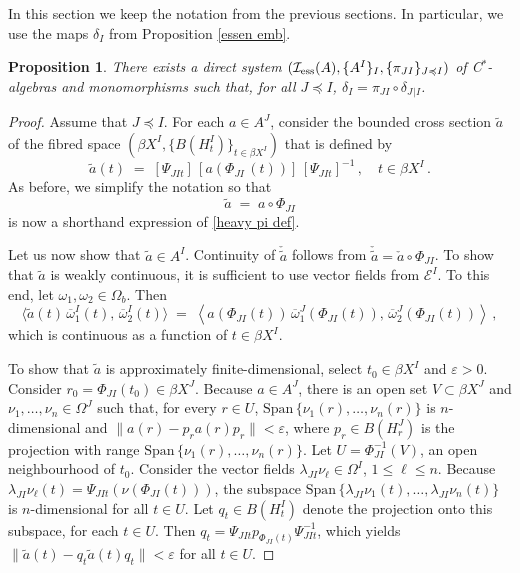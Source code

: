 \documentclass{amsart}
\newtheorem{proposition}[theorem]{Proposition}
\theoremstyle{definition}
\theoremstyle{remark}
\begin{document}
In this section we keep the notation from the previous sections.
In particular, we use the maps $\delta_I$ from Proposition \ref{essen emb}.

\begin{proposition}\label{systems2}
There exists a direct system $( \mathcal I_{\rm ess}(A), \{A^I\}_{I}, \{\pi_{JI}\}_{J \preccurlyeq I})$
of C$^*$-algebras and monomorphisms
such that, for all $J \preccurlyeq I$,
$\delta_I=\pi_{JI}\circ\delta_J{}_{\vert I}$.
\end{proposition}

\begin{proof}
Assume that $J\preccurlyeq I$. For each $a\in A^J$, consider the bounded cross section $\tilde a$ of the fibred space
$(\beta X^I, \{B(H^I_t)\}_{t\in\beta X^I})$ that is defined by
\begin{equation}\label{heavy pi def}
\tilde a(t)\;=\;[\Psi_{JIt}]\,[a\left(\Phi_{JI}\,(t)\right)] \, [\Psi_{JIt}]^{-1} \,,\quad t\in\beta X^I\,.
\end{equation}
As before, we simplify the notation so that
\begin{equation}\label{light pi def}
\tilde a\;=\; a \circ \Phi_{JI}
\end{equation}
is now a shorthand expression of \eqref{heavy pi def}.

Let us now show that $\tilde a\in A^I$.  Continuity of $\check{\tilde a}$ follows from $\check{\tilde a}=\check{a}\circ\Phi_{JI}$. To show that $\tilde a$ is weakly continuous,
it is sufficient to use vector fields from $\mathcal E^I$. To this end, let $\omega_1,\omega_2\in\Omega_b$. Then
\[
\langle \tilde a(t)\,\overline\omega_1^I(t), \,\overline\omega_2^I(t)\rangle \;=\;
\left\langle   a(\Phi_{JI}(t))\,\overline\omega_1^J(\Phi_{JI}(t)), \,\overline\omega_2^J(\Phi_{JI}(t))\right\rangle\,,
\]
which is continuous as a function of $t\in\beta X^I$.

To show that $\tilde a$ is approximately finite-dimensional, select $t_0\in\beta X^I$ and $\varepsilon>0$. Consider $r_0=\Phi_{JI}(t_0)\in\beta X^J$.
Because $a\in A^J$, there is an open set $V\subset\beta X^J$ and $\nu_1,\dots,\nu_n\in\Omega^J$ such that, for every $r\in U$,
$\mbox{Span}\,\{\nu_1(r),\dots,\nu_n(r)\}$ is $n$-dimensional and $\|a(r)-p_ra(r)p_r\|<\varepsilon$, where $p_r\in B(H_r^J)$ is the projection
with range $\mbox{Span}\,\{\nu_1(r),\dots,\nu_n(r)\}$. Let $U=\Phi_{JI}^{-1}(V)$, an open neighbourhood of $t_0$. Consider the
vector fields $\lambda_{JI}\nu_\ell\in\Omega^I$, $1\leq\ell\leq n$. Because $\lambda_{JI}\nu_\ell(t)=\Psi_{JIt}\left(\nu(\Phi_{JI}(t))\right)$,
the subspace $\mbox{Span}\,\{\lambda_{JI}\nu_1(t),\dots,\lambda_{JI}\nu_n(t)\}$ is $n$-dimensional for all $t\in U$.
Let $q_t\in B(H_t^I)$ denote the projection onto this subspace, for each $t\in U$.
Then  $q_t=\Psi_{JIt}p_{\Phi_{JI}(t)}\Psi_{JIt}^{-1}$, which yields
$\|\tilde a(t)-q_t\tilde a(t) q_t\|<\varepsilon$ for all $t\in U$.


\end{proof}
\end{document}

